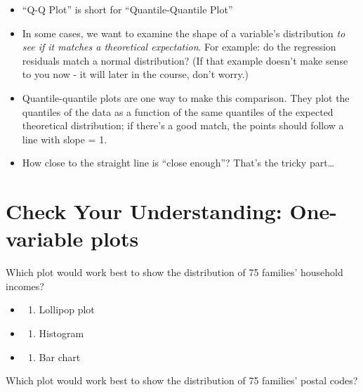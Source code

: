 \documentclass[
  letterpaper,
  DIV=11,
  numbers=noendperiod]{scrreprt}
\providecommand{\tightlist}{%
  \setlength{\itemsep}{0pt}\setlength{\parskip}{0pt}}\usepackage{longtable,booktabs,array}
\theoremstyle{remark}
\begin{document}
\begin{itemize}
\tightlist
\item
  ``Q-Q Plot'' is short for ``Quantile-Quantile Plot''
\item
  In some cases, we want to examine the shape of a variable's
  distribution \emph{to see if it matches a theoretical expectation}.
  For example: do the regression residuals match a normal distribution?
  (If that example doesn't make sense to you now - it will later in the
  course, don't worry.)
\item
  Quantile-quantile plots are one way to make this comparison. They plot
  the quantiles of the data as a function of the same quantiles of the
  expected theoretical distribution; if there's a good match, the points
  should follow a line with slope = 1.
\item
  How close to the straight line is ``close enough''? That's the tricky
  part\ldots{}
\end{itemize}

\section{Check Your Understanding: One-variable
plots}\label{check-your-understanding-one-variable-plots}

Which plot would work best to show the distribution of 75 families'
household incomes?

\begin{itemize}
\tightlist
\item
  \begin{enumerate}
  \def\labelenumi{(\Alph{enumi})}
  \tightlist
  \item
    Lollipop plot\\
  \end{enumerate}
\item
  \begin{enumerate}
  \def\labelenumi{(\Alph{enumi})}
  \setcounter{enumi}{1}
  \tightlist
  \item
    Histogram\\
  \end{enumerate}
\item
  \begin{enumerate}
  \def\labelenumi{(\Alph{enumi})}
  \setcounter{enumi}{2}
  \tightlist
  \item
    Bar chart
  \end{enumerate}
\end{itemize}

Which plot would work best to show the distribution of 75 families'
postal codes?
\end{document}
